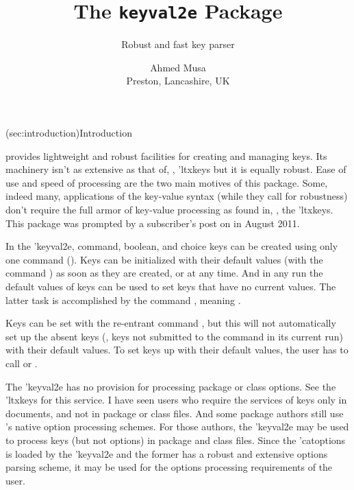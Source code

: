 \documentclass[
  use-a4-paper,
  use-10pt-font,
  final-version,
  use-UK-English,
  fancy-section-headings,
  frame-section-numbers,
  para-abstract-style,
  input-config-file,
  no-hyperref-messages
]{amltxdoc}
\begin{document}
\begin{frontmatter}
\title{The \texttt{\color{blue}keyval2e} Package}
\subtitle{Robust and fast key parser}
\author{Ahmed Musa \\Preston, Lancashire, UK}

\end{frontmatter}

\begin{xwmshade}[fillcolor=white,framecolor=orange,framerule=1pt,framesep=2pt,
  width=1.0\hsize]\tableofcontents
\end{xwmshade}


\docsection(sec:introduction){Introduction}

 provides lightweight and robust facilities for creating and managing keys. Its machinery isn't as extensive as that of, \eg, \pkg'{ltxkeys} but it is equally robust. Ease of use and speed of processing are the two main motives of this package. Some, indeed many, applications of the key-value syntax (while they call for robustness) don't require the full armor of key-value processing as found in, \eg, the \pkg'{ltxkeys}. This package was prompted by a subscriber's post on \comptexttex in August 2011.

In the \pkg'{keyval2e}, command, boolean, and choice keys can be created using only one command (\fx{\kve@definekeys}). Keys can be initialized with their default values (with the command \fx{\kve@setdefaults}) as soon as they are created, or at any time. And in any run the default values of keys can be used to set keys that have no current values. The latter task is accomplished by the command \fx{\kve@setafterdefaults}, meaning .

Keys can be set with the re-entrant command \fx{\kve@setkeys}, but this will not automatically set up the absent keys (\ie, keys not submitted to the command in its current run) with their default values. To set keys up with their default values, the user has to call \fx{\kve@setdefaults} or \fx{\kve@setafterdefaults}.

The \pkg'{keyval2e} has no provision for processing package or class options. See the \pkg'{ltxkeys} for this service. I have seen users who require the services of keys only in documents, and not in package or class files. And some package authors still use \latex's native option processing schemes. For those authors, the \pkg'{keyval2e} may be used to process keys (but not options) in package and class files. Since the \pkg'{catoptions} is loaded by the \pkg'{keyval2e} and the former has a robust and extensive options parsing scheme, it may be used for the options processing requirements of the user.
\end{document}
